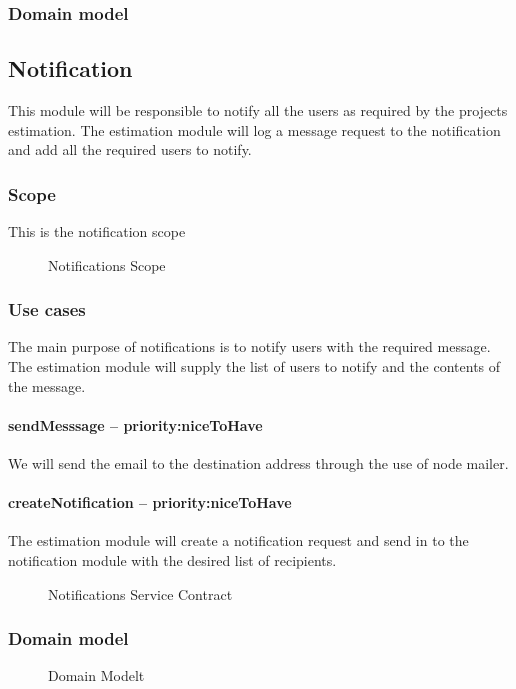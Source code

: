 \subsubsection{Domain model}

\subsection{Notification}
This module will be responsible to notify all the users as required by the projects estimation. The estimation module will log a message request to the notification and add all the required users to notify.
\subsubsection{Scope}
This is the notification scope
	\begin{figure}[H]
	    	\centering
	    	\caption{Notifications Scope}
	    	\label{fig:Notification_Scope}
   	\end{figure}
\subsubsection{Use cases}
The main purpose of notifications is to notify users with the required message. The estimation module will supply the list of users to notify and the contents of the message.
\paragraph{sendMesssage -- priority:niceToHave}
We will send the email to the destination address through the use of node mailer. 
\paragraph{createNotification -- priority:niceToHave}
The estimation module will create a notification request and send in to the notification module with the desired list of recipients.
	\begin{figure}[H]
	    	\centering
	    	\caption{Notifications Service Contract}
	    	\label{fig:Notification_Service Contract}
   	\end{figure}
\subsubsection{Domain model}
	\begin{figure}[H]
	    	\centering
	    	\caption{Domain Modelt}
	    	\label{fig:Domain Model}
   	\end{figure}
